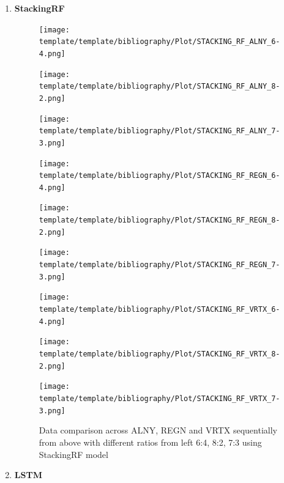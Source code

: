 \documentclass{ieeeojies}
\begin{document}
\begin{enumerate}
  \item \textbf{StackingRF} 
\begin{figure}[H]
    \centering
    \begin{minipage}{0.155\textwidth}
    \centering
    \texttt{[image: template/template/bibliography/Plot/STACKING\_RF\_ALNY\_6-4.png]}
    \end{minipage}
    \hfill
    \begin{minipage}{0.155\textwidth}
    \centering
    \texttt{[image: template/template/bibliography/Plot/STACKING\_RF\_ALNY\_8-2.png]}
    \end{minipage}
    \hfill
    \begin{minipage}{0.155\textwidth}
    \centering
    \texttt{[image: template/template/bibliography/Plot/STACKING\_RF\_ALNY\_7-3.png]}
    \end{minipage}
    \hfill
    \begin{minipage}{0.155\textwidth}
    \centering
    \texttt{[image: template/template/bibliography/Plot/STACKING\_RF\_REGN\_6-4.png]}
    \end{minipage}
    \hfill
    \begin{minipage}{0.155\textwidth}
    \centering
    \texttt{[image: template/template/bibliography/Plot/STACKING\_RF\_REGN\_8-2.png]}
    \end{minipage}
    \hfill
    \begin{minipage}{0.155\textwidth}
    \centering
    \texttt{[image: template/template/bibliography/Plot/STACKING\_RF\_REGN\_7-3.png]}
    \end{minipage}
    \hfill
    \begin{minipage}{0.155\textwidth}
    \centering
    \texttt{[image: template/template/bibliography/Plot/STACKING\_RF\_VRTX\_6-4.png]}
    \end{minipage}
    \hfill
    \begin{minipage}{0.155\textwidth}
    \centering
    \texttt{[image: template/template/bibliography/Plot/STACKING\_RF\_VRTX\_8-2.png]}
    \end{minipage}
    \hfill
    \begin{minipage}{0.155\textwidth}
    \centering
    \texttt{[image: template/template/bibliography/Plot/STACKING\_RF\_VRTX\_7-3.png]}
    \end{minipage}
\caption{Data comparison across ALNY, REGN and VRTX sequentially from above with different ratios from left 6:4, 8:2, 7:3 using StackingRF model}
\label{fig:combined}
\end{figure}
  \item \textbf{LSTM} 

\end{enumerate}
\end{document}

